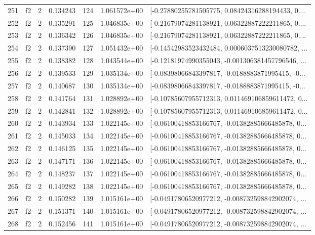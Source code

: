 \begin{tabular}{lllrlrl}
251 &  f2 &   2 &  0.134243 &  124 &  1.061572e+00 &  [-0.27880255781505775, 0.08424316288194433, 0.... \\
252 &  f2 &   2 &  0.135291 &  125 &  1.046835e+00 &  [-0.21679074281138921, 0.06322887222211865, 0.... \\
253 &  f2 &   2 &  0.136342 &  126 &  1.046835e+00 &  [-0.21679074281138921, 0.06322887222211865, 0.... \\
254 &  f2 &   2 &  0.137390 &  127 &  1.051432e+00 &  [-0.14542983523432484, 0.0006037513230080782, ... \\
255 &  f2 &   2 &  0.138382 &  128 &  1.043544e+00 &  [-0.12181974990355043, -0.001306381457796546, ... \\
256 &  f2 &   2 &  0.139533 &  129 &  1.035134e+00 &  [-0.08398066843397817, -0.0188883871995415, -0... \\
257 &  f2 &   2 &  0.140687 &  130 &  1.035134e+00 &  [-0.08398066843397817, -0.0188883871995415, -0... \\
258 &  f2 &   2 &  0.141764 &  131 &  1.028892e+00 &  [-0.10785607955712313, 0.011469106859611472, 0... \\
259 &  f2 &   2 &  0.142841 &  132 &  1.028892e+00 &  [-0.10785607955712313, 0.011469106859611472, 0... \\
260 &  f2 &   2 &  0.143934 &  133 &  1.022145e+00 &  [-0.06100418853166767, -0.01382885666485878, 0... \\
261 &  f2 &   2 &  0.145033 &  134 &  1.022145e+00 &  [-0.06100418853166767, -0.01382885666485878, 0... \\
262 &  f2 &   2 &  0.146125 &  135 &  1.022145e+00 &  [-0.06100418853166767, -0.01382885666485878, 0... \\
263 &  f2 &   2 &  0.147171 &  136 &  1.022145e+00 &  [-0.06100418853166767, -0.01382885666485878, 0... \\
264 &  f2 &   2 &  0.148237 &  137 &  1.022145e+00 &  [-0.06100418853166767, -0.01382885666485878, 0... \\
265 &  f2 &   2 &  0.149282 &  138 &  1.022145e+00 &  [-0.06100418853166767, -0.01382885666485878, 0... \\
266 &  f2 &   2 &  0.150282 &  139 &  1.015161e+00 &  [-0.04917806520977212, -0.008732598842902074, ... \\
267 &  f2 &   2 &  0.151371 &  140 &  1.015161e+00 &  [-0.04917806520977212, -0.008732598842902074, ... \\
268 &  f2 &   2 &  0.152456 &  141 &  1.015161e+00 &  [-0.04917806520977212, -0.008732598842902074, ... \\

\end{tabular}
